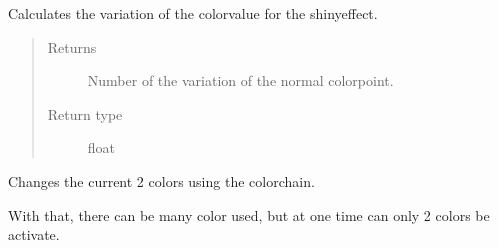 \documentclass[letterpaper,10pt,english]{sphinxmanual}
\begin{document}
\begin{fulllineitems}
\begin{quote}
\begin{description}
\begin{itemize}
\end{itemize}

\end{description}\end{quote}

\begin{fulllineitems}
\label{\detokenize{anoog.automation:anoog.automation.bg_booster.Color_Gradient_Booster.calc_shiny_flow_effect}}
\sphinxAtStartPar
Calculates the variation of the color\sphinxhyphen{}value for the shiny\sphinxhyphen{}effect.
\begin{quote}\begin{description}
\item[{Returns}] \leavevmode
\sphinxAtStartPar
Number of the variation of the normal color\sphinxhyphen{}point.

\item[{Return type}] \leavevmode
\sphinxAtStartPar
float

\end{description}\end{quote}

\end{fulllineitems}


\begin{fulllineitems}
\label{\detokenize{anoog.automation:anoog.automation.bg_booster.Color_Gradient_Booster.color_chain_change}}
\sphinxAtStartPar
Changes the current 2 colors using the color\sphinxhyphen{}chain.

\sphinxAtStartPar
With that, there can be many color used, but at one time can only 2 colors be activate.

\end{fulllineitems}



\end{fulllineitems}
\end{document}
